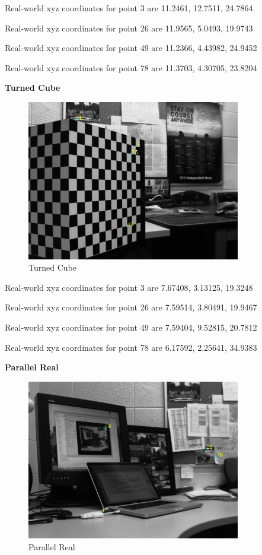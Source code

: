 \documentclass[10pt,a4paper]{article}
\begin{document}
Real-world xyz coordinates for point 3 are 11.2461, 12.7511, 24.7864

Real-world xyz coordinates for point 26 are 11.9565, 5.0493, 19.9743

Real-world xyz coordinates for point 49 are 11.2366, 4.43982, 24.9452

Real-world xyz coordinates for point 78 are 11.3703, 4.30705, 23.8204

\textbf{Turned Cube}

\begin{figure}[H]
\centering
\includegraphics[height=7cm,keepaspectratio]{turnCube_3dinfo}
\caption{Turned Cube}
\end{figure}

Real-world xyz coordinates for point 3 are 7.67408, 3.13125, 19.3248

Real-world xyz coordinates for point 26 are 7.59514, 3.80491, 19.9467

Real-world xyz coordinates for point 49 are 7.59404, 9.52815, 20.7812

Real-world xyz coordinates for point 78 are 6.17592, 2.25641, 34.9383

\textbf{Parallel Real}

\begin{figure}[H]
\centering
\includegraphics[height=7cm,keepaspectratio]{parallelreal_3dinfo}
\caption{Parallel Real}
\end{figure}
\end{document}
